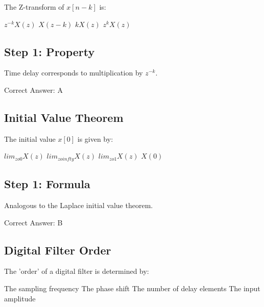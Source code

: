 The Z-transform of $x[n-k]$ is:

\begin{choices}
    \correctchoice $z^{-k} X(z)$
    \choice $X(z-k)$
    \choice $k X(z)$
    \choice $z^k X(z)$
\end{choices}

\begin{solution}

\subsection*{Step 1: Property}
Time delay corresponds to multiplication by $z^{-k}$.

Correct Answer: A
\end{solution}

\clearpage

\subsection{Initial Value Theorem}

The initial value $x[0]$ is given by:

\begin{choices}
    \choice $lim_{z 	o 0} X(z)$
    \correctchoice $lim_{z 	o infty} X(z)$
    \choice $lim_{z 	o 1} X(z)$
    \choice $X(0)$
\end{choices}

\begin{solution}

\subsection*{Step 1: Formula}
Analogous to the Laplace initial value theorem.

Correct Answer: B
\end{solution}

\clearpage

\subsection{Digital Filter Order}

The 'order' of a digital filter is determined by:

\begin{choices}
    \choice The sampling frequency
    \choice The phase shift
    \correctchoice The number of delay elements
    \choice The input amplitude
\end{choices}

